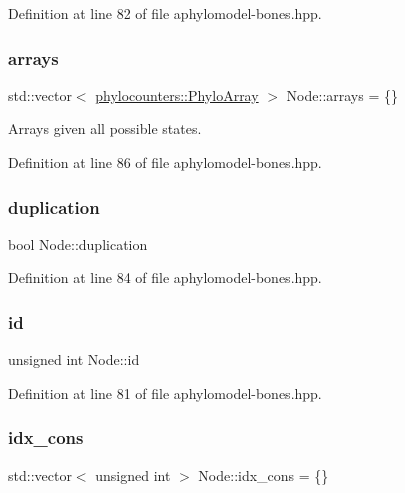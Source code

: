 Definition at line 82 of file aphylomodel-\/bones.\+hpp.

\mbox{\label{class_node_a269d78db10090d106c697d7c73bac9c7}} 
\subsubsection{\texorpdfstring{arrays}{arrays}}
{\footnotesize\ttfamily std\+::vector$<$ \hyperlink{namespacebarry_1_1counters_1_1phylo_abd293bf65e494e903639fb5fb2c91604}{phylocounters\+::\+Phylo\+Array} $>$ Node\+::arrays = \{\}}



Arrays given all possible states. 



Definition at line 86 of file aphylomodel-\/bones.\+hpp.

\mbox{\label{class_node_a3129939e8a58c055cb5ad8db8be6b10a}} 
\subsubsection{\texorpdfstring{duplication}{duplication}}
{\footnotesize\ttfamily bool Node\+::duplication}



Definition at line 84 of file aphylomodel-\/bones.\+hpp.

\mbox{\label{class_node_adb90577d9d796c4ccbccf41ce2efc6c9}} 
\subsubsection{\texorpdfstring{id}{id}}
{\footnotesize\ttfamily unsigned int Node\+::id}



Definition at line 81 of file aphylomodel-\/bones.\+hpp.

\mbox{\label{class_node_a95fa1b71d6c1a8cf155520c6d974d540}} 
\subsubsection{\texorpdfstring{idx\+\_\+cons}{idx\_cons}}
{\footnotesize\ttfamily std\+::vector$<$ unsigned int $>$ Node\+::idx\+\_\+cons = \{\}}



